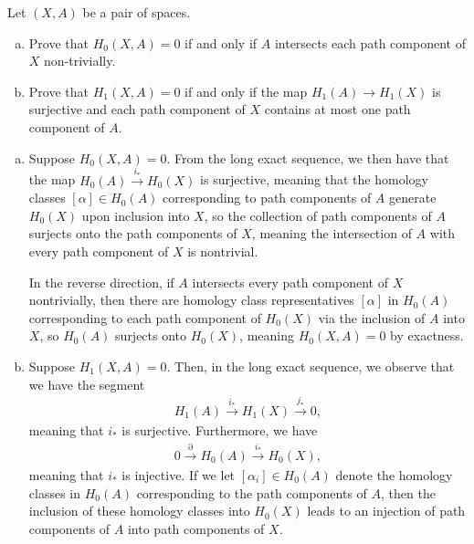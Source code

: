 \documentclass[10pt]{mypackage}
\begin{document}
\RaggedRight
\begin{problem}[Problem 1]
  Let $\left( X,A \right)$ be a pair of spaces.
  \begin{enumerate}[(a)]
    \item Prove that $H_0\left( X,A \right) = 0$ if and only if $A$ intersects each path component of $X$ non-trivially.
    \item Prove that $H_1\left( X,A \right) = 0$ if and only if the map $H_1\left( A \right)\rightarrow H_1\left( X \right)$ is surjective and each path component of $X$ contains at most one path component of $A$.
  \end{enumerate}
\end{problem}
\begin{solution}\hfill
  \begin{enumerate}[(a)]
    \item Suppose $H_0\left( X,A \right) = 0$. From the long exact sequence, we then have that the map $H_0\left( A \right)\xrightarrow{i_{\ast}} H_0\left( X \right)$ is surjective, meaning that the homology classes $\left[ \alpha \right]\in H_0\left( A \right)$ corresponding to path components of $A$ generate $H_0\left( X \right)$ upon inclusion into $X$, so the collection of path components of $A$ surjects onto the path components of $X$, meaning the intersection of $A$ with every path component of $X$ is nontrivial.

      In the reverse direction, if $A$ intersects every path component of $X$ nontrivially, then there are homology class representatives $\left[ \alpha \right]$ in $H_0\left( A \right)$ corresponding to each path component of $H_0\left( X \right)$ via the inclusion of $A$ into $X$, so $H_0\left( A \right)$ surjects onto $H_0\left( X \right)$, meaning $H_0\left( X,A \right) = 0$ by exactness.
    \item Suppose $H_1\left( X,A \right) = 0$. Then, in the long exact sequence, we observe that we have the segment
      \begin{align*}
        H_1\left( A \right) \xrightarrow{i_{\ast}} H_1\left( X \right)\xrightarrow{j_{\ast}}0,
      \end{align*}
      meaning that $i_{\ast}$ is surjective. Furthermore, we have
      \begin{align*}
        0 \xrightarrow{\partial} H_0\left( A \right)\xrightarrow{i_{\ast}}H_0\left( X \right),
      \end{align*}
      meaning that $i_{\ast}$ is injective. If we let $\left[ \alpha_i \right]\in H_0\left( A \right)$ denote the homology classes in $H_0\left( A \right)$ corresponding to the path components of $A$, then the inclusion of these homology classes into $H_0\left( X \right)$ leads to an injection of path components of $A$ into path components of $X$.


\end{enumerate}
\end{solution}
\end{document}
